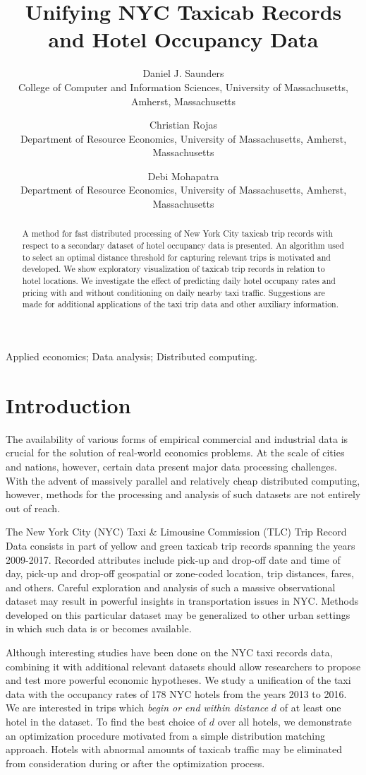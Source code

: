 \documentclass[useAMS, referee, usenatbib]{biom}
\title{Unifying NYC Taxicab Records and Hotel Occupancy Data}
\author
{Daniel J. Saunders \emailx{djsaunde@cs.umass.edu} \\
College of Computer and Information Sciences, University of Massachusetts, Amherst, Massachusetts
\and
Christian Rojas \emailx{rojas@resecon.umass.edu} \\
Department of Resource Economics, University of Massachusetts, 
Amherst, Massachusetts
\and
Debi Mohapatra \emailx{dmohapatra@umass.edu} \\
Department of Resource Economics, University of Massachusetts, 
Amherst, Massachusetts}
\begin{document}
\label{firstpage}

\begin{abstract}
A method for fast distributed processing of New York City taxicab trip records with respect to a secondary dataset of hotel occupancy data is presented. An algorithm used to select an optimal distance threshold for capturing relevant trips is motivated and developed. We show exploratory visualization of taxicab trip records in relation to hotel locations. We investigate the effect of predicting daily hotel occupany rates and pricing with and without conditioning on daily nearby taxi traffic. Suggestions are made for additional applications of the taxi trip data and other auxiliary information.
\end{abstract}

\begin{keywords}
Applied economics; Data analysis; Distributed computing.
\end{keywords}

\maketitle

\section{Introduction}
\label{s:intro}

The availability of various forms of empirical commercial and industrial data is crucial for the solution of real-world economics problems. At the scale of cities and nations, however, certain data present major data processing challenges. With the advent of massively parallel and relatively cheap distributed computing, however, methods for the processing and analysis of such datasets are not entirely out of reach.

The New York City (NYC) Taxi \& Limousine Commission (TLC) Trip Record Data consists in part of yellow and green taxicab trip records spanning the years 2009-2017. Recorded attributes include pick-up and drop-off date and time of day, pick-up and drop-off geospatial or zone-coded location, trip distances, fares, and others. Careful exploration and analysis of such a massive observational dataset may result in powerful insights in transportation issues in NYC. Methods developed on this particular dataset may be generalized to other urban settings in which such data is or becomes available.

Although interesting studies have been done on the NYC taxi records data, combining it with additional relevant datasets should allow researchers to propose and test more powerful economic hypotheses. We study a unification of the taxi data with the occupancy rates of 178 NYC hotels from the years 2013 to 2016. We are interested in trips which \textit{begin or end within distance} $d$ of at least one hotel in the dataset. To find the best choice of $d$ over all hotels, we demonstrate an optimization procedure motivated from a simple distribution matching approach. Hotels with abnormal amounts of taxicab traffic may be eliminated from consideration during or after the optimization process.
\end{document}

